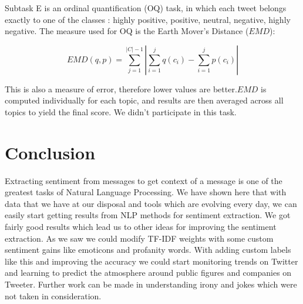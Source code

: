 \documentclass[runningheads,a4paper]{llncs}
\begin{document}
Subtask E is an ordinal quantification (OQ) task, in which each tweet belongs exactly to one of the classes : highly positive, positive, neutral, negative, highly negative. The measure used for OQ is the Earth Mover's Distance ($EMD$):  

\begin{equation}
EMD(q, p) = \sum_{j=1}^{|C| - 1}|\sum_{i=1}^jq(c_i) - \sum_{i=1}^jp(c_i)|
\end{equation}

This is also a measure of error, therefore lower values are better.$EMD$ is computed individually for each topic, and results are then averaged across all topics to yield the final score. We didn't participate in this task.

\section{Conclusion}
Extracting sentiment from messages to get context of a message is one of the greatest tasks of Natural Language Processing. We have shown here that with data that we have at our disposal and tools which are evolving every day, we can easily start getting results from NLP methods for sentiment extraction. We got fairly good results which lead us to other ideas for improving the sentiment extraction. As we saw we could modify TF-IDF weights with some custom sentiment gains like emoticons and profanity words. With adding custom labels like this and improving the accuracy we could start monitoring trends on Twitter and learning to predict the atmosphere around public figures and companies on Tweeter. Further work can be made in understanding irony and jokes which were not taken in consideration.




\end{document}
